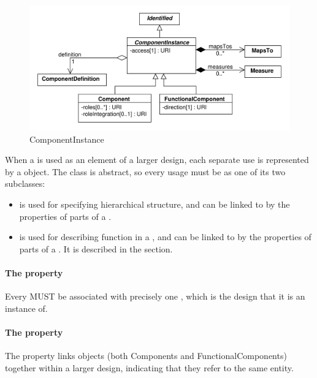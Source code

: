 \begin{figure}[ht]
\begin{center}
\includegraphics[scale=0.6]{uml/component_instance}
\caption[]{ComponentInstance}
\label{uml:component}
\end{center}
\end{figure}

When a  is used as an element of a larger design, each separate use is represented by a  object.  
The  class is abstract, so every usage must be as one of its two subclasses:
\begin{itemize}
\item {} is used for specifying hierarchical structure, and can be linked to by the properties of parts of a .
\item {} is used for describing function in a , and can be linked to by the properties of parts of a .  It is described in the  section.
\end{itemize}

\paragraph{The  property}
\label{sec:componentDefinition}

Every  MUST be associated with precisely one
, which is the design that it is an instance of.

\paragraph{The  property}
\label{sec:mapsTo}

The  property links  objects (both Components and FunctionalComponents) together within a larger design, indicating that they refer to the same entity.

